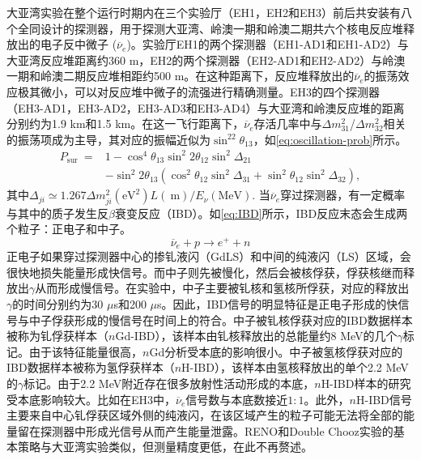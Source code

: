 \documentclass[a4paper,zihao=-4]{article}
\begin{document}
大亚湾实验在整个运行时期内在三个实验厅（EH1，EH2和EH3）前后共安装有八个全同设计的探测器，用于探测大亚湾、岭澳一期和岭澳二期共六个核电反应堆释放出的电子反中微子 ($\overline{\nu}_e$)。实验厅EH1的两个探测器（EH1-AD1和EH1-AD2）与大亚湾反应堆距离约360 m，EH2的两个探测器（EH2-AD1和EH2-AD2）与岭澳一期和岭澳二期反应堆相距约500 m。在这种距离下，反应堆释放出的$\overline{\nu}_e$的振荡效应极其微小，可以对反应堆中微子的流强进行精确测量。EH3的四个探测器（EH3-AD1，EH3-AD2，EH3-AD3和EH3-AD4）与大亚湾和岭澳反应堆的距离分别约为1.9 km和1.5 km。在这一飞行距离下，$\overline{\nu}_e$存活几率中与$\Delta m_{31}^2$/$\Delta m_{32}^2$相关的振荡项成为主导，其对应的振幅近似为$\sin^22\theta_{13}$，如\cref{eq:oscillation-prob}所示。
\begin{equation}\label{eq:oscillation-prob}
	\begin{aligned}
P_{\text {sur }}= & 1-\cos ^4 \theta_{13} \sin ^2 2 \theta_{12} \sin ^2 \Delta_{21} \\
& -\sin ^2 2 \theta_{13}\left(\cos ^2 \theta_{12} \sin ^2 \Delta_{31}+\sin ^2 \theta_{12} \sin ^2 \Delta_{32}\right),
\end{aligned}
\end{equation}
其中$\Delta_{j i} \simeq 1.267 \Delta m_{j i}^2\left(\mathrm{eV}^2\right) L(\mathrm{~m}) / E_\nu(\mathrm{MeV})$. 
当$\overline{\nu}_e$穿过探测器，有一定概率与其中的质子发生反$\beta$衰变反应（IBD）。如\cref{eq:IBD}所示，IBD反应末态会生成两个粒子：正电子和中子。
\begin{equation}\label{eq:IBD}
	\overline{\nu}_e+p\to e^++n
\end{equation}
正电子如果穿过探测器中心的掺钆液闪（GdLS）和中间的纯液闪（LS）区域，会很快地损失能量形成快信号。而中子则先被慢化，然后会被核俘获，俘获核继而释放出$\gamma$从而形成慢信号。在实验中，中子主要被钆核和氢核所俘获，对应的释放出$\gamma$的时间分别约为30 $\mu$s和200 $\mu$s。因此，IBD信号的明显特征是正电子形成的快信号与中子俘获形成的慢信号在时间上的符合。中子被钆核俘获对应的IBD数据样本被称为钆俘获样本（$n$Gd-IBD），该样本由钆核释放出的总能量约8 MeV的几个$\gamma$标记。由于该特征能量很高，$n$Gd分析受本底的影响很小。中子被氢核俘获对应的IBD数据样本被称为氢俘获样本（$n$H-IBD），该样本由氢核释放出的单个2.2 MeV的$\gamma$标记。由于2.2 MeV附近存在很多放射性活动形成的本底，$n$H-IBD样本的研究受本底影响较大。比如在EH3中，$\overline{\nu}_e$信号数与本底数接近$1:1$。此外，$n$H-IBD信号主要来自中心钆俘获区域外侧的纯液闪，在该区域产生的粒子可能无法将全部的能量留在探测器中形成光信号从而产生能量泄露。RENO和Double Chooz实验的基本策略与大亚湾实验类似，但测量精度更低，在此不再赘述。
\end{document}
